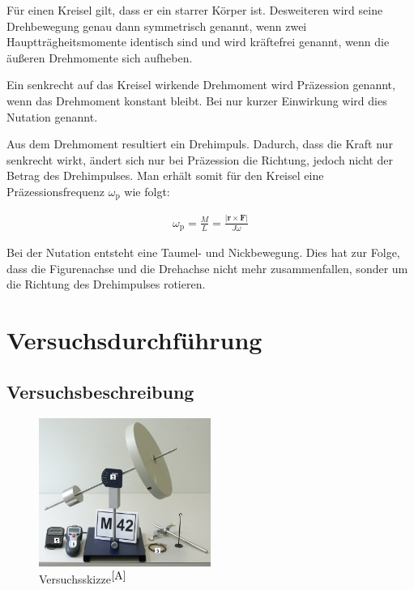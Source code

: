 \documentclass[fontsize=12pt]{scrartcl}
\renewcommand{\l}{\left\vert}
\renewcommand{\r}{\right\vert}
\begin{document}
Für einen Kreisel gilt, dass er ein starrer Körper ist. Desweiteren wird seine Drehbewegung genau dann symmetrisch genannt, wenn zwei Hauptträgheitsmomente identisch sind und wird kräftefrei genannt, wenn die äußeren Drehmomente sich aufheben. \par 

Ein senkrecht auf das Kreisel wirkende Drehmoment wird Präzession genannt, wenn das Drehmoment konstant bleibt. Bei nur  kurzer Einwirkung wird dies Nutation genannt. \par

Aus dem Drehmoment resultiert ein Drehimpuls. Dadurch, dass die Kraft nur senkrecht wirkt, ändert sich nur bei Präzession die Richtung, jedoch nicht der Betrag des Drehimpulses. Man erhält somit für den Kreisel eine Präzessionsfrequenz $\omega_\text{p}$ wie folgt:

\begin{align*}
\omega_{\text{p}} = \frac{M}{L} = \frac{\l \textbf{r} \times \textbf{F} \r}{J\omega}
\end{align*} \par 

Bei der Nutation entsteht eine Taumel- und Nickbewegung. Dies hat zur Folge, dass die Figurenachse und die Drehachse nicht mehr zusammenfallen, sonder um die Richtung des Drehimpulses rotieren.
\newpage

\section{Versuchsdurchführung}

\subsection{Versuchsbeschreibung}
\begin{figure}[H]
\centering
\includegraphics[width=0.5\textwidth]{Graphik/M42}
\caption{Versuchsskizze$^{\cite{A}}$}
\end{figure}
\end{document}
